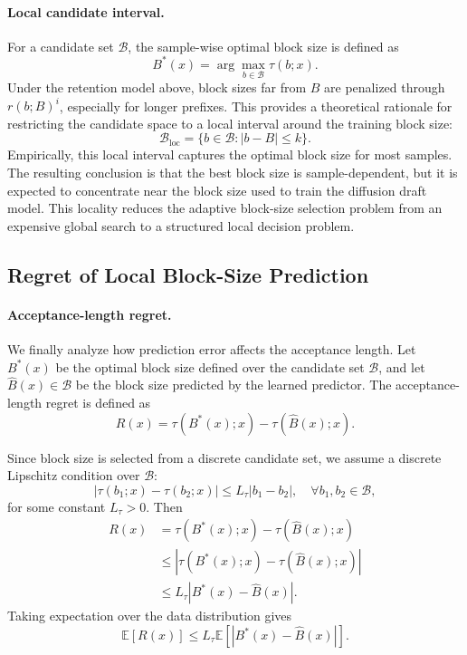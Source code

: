 \documentclass{article}
\begin{document}
\paragraph{Local candidate interval.}
For a candidate set $\mathcal{B}$, the sample-wise optimal block size is defined as
\begin{equation}
B^*(x)
=
\arg\max_{b\in\mathcal{B}}
\tau(b;x).
\end{equation}
Under the retention model above, block sizes far from $B$ are penalized through $r(b;B)^i$, especially for longer prefixes. This provides a theoretical rationale for restricting the candidate space to a local interval around the training block size:
\begin{equation}
\mathcal{B}_{\mathrm{loc}}
=
\{b\in\mathcal{B}: |b-B|\le k\}.
\end{equation}
Empirically, this local interval captures the optimal block size for most samples. The resulting conclusion is that the best block size is sample-dependent, but it is expected to concentrate near the block size used to train the diffusion draft model. This locality reduces the adaptive block-size selection problem from an expensive global search to a structured local decision problem.

\subsection{Regret of Local Block-Size Prediction}

\paragraph{Acceptance-length regret.}
We finally analyze how prediction error affects the acceptance length. Let $B^*(x)$ be the optimal block size defined over the candidate set $\mathcal{B}$, and let $\hat{B}(x)\in\mathcal{B}$ be the block size predicted by the learned predictor. The acceptance-length regret is defined as
\begin{equation}
R(x)
=
\tau(B^*(x);x)
-
\tau(\hat{B}(x);x).
\end{equation}

Since block size is selected from a discrete candidate set, we assume a discrete Lipschitz condition over $\mathcal{B}$:
\begin{equation}
|\tau(b_1;x)-\tau(b_2;x)|
\le
L_\tau |b_1-b_2|,
\quad
\forall b_1,b_2\in\mathcal{B},
\end{equation}
for some constant $L_\tau>0$. Then
\begin{equation}
\begin{aligned}
R(x)
&=
\tau(B^*(x);x)
-
\tau(\hat{B}(x);x) \\
&\le
\left|
\tau(B^*(x);x)
-
\tau(\hat{B}(x);x)
\right| \\
&\le
L_\tau
|B^*(x)-\hat{B}(x)|.
\end{aligned}
\end{equation}
Taking expectation over the data distribution gives
\begin{equation}
\mathbb{E}[R(x)]
\le
L_\tau
\mathbb{E}
\left[
|B^*(x)-\hat{B}(x)|
\right].
\end{equation}
\end{document}
